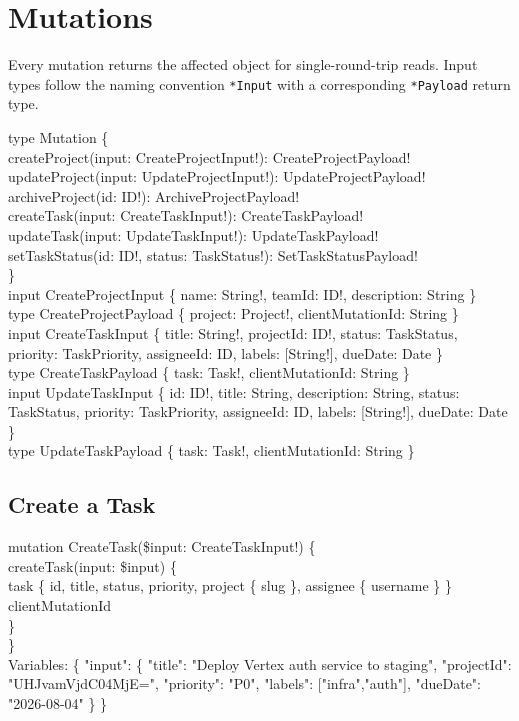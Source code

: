 \section*{Mutations}

Every mutation returns the affected object for single-round-trip reads. Input types follow the naming convention \texttt{*Input} with a corresponding \texttt{*Payload} return type.

\vspace{2pt}
\begin{schemabox}[title=Mutation Root \& Input Types (Partial)]
type Mutation \{\\
\quad createProject(input: CreateProjectInput!): CreateProjectPayload!\\
\quad updateProject(input: UpdateProjectInput!): UpdateProjectPayload!\\
\quad archiveProject(id: ID!): ArchiveProjectPayload!\\
\quad createTask(input: CreateTaskInput!): CreateTaskPayload!\\
\quad updateTask(input: UpdateTaskInput!): UpdateTaskPayload!\\
\quad setTaskStatus(id: ID!, status: TaskStatus!): SetTaskStatusPayload!\\
\}\\[2pt]
input CreateProjectInput \{ name: String!, teamId: ID!, description: String \}\\
type CreateProjectPayload \{ project: Project!, clientMutationId: String \}\\[2pt]
input CreateTaskInput \{ title: String!, projectId: ID!, status: TaskStatus, priority: TaskPriority, assigneeId: ID, labels: [String!], dueDate: Date \}\\
type CreateTaskPayload \{ task: Task!, clientMutationId: String \}\\[2pt]
input UpdateTaskInput \{ id: ID!, title: String, description: String, status: TaskStatus, priority: TaskPriority, assigneeId: ID, labels: [String!], dueDate: Date \}\\
type UpdateTaskPayload \{ task: Task!, clientMutationId: String \}
\end{schemabox}

\subsection*{Create a Task}

\vspace{2pt}
\begin{querybox}[title=Mutation: Create Task]
mutation CreateTask(\$input: CreateTaskInput!) \{\\
\quad createTask(input: \$input) \{\\
\qquad task \{ id, title, status, priority, project \{ slug \}, assignee \{ username \} \}\\
\qquad clientMutationId\\
\quad \}\\
\}\\[2pt]
Variables: \{ "input": \{ "title": "Deploy Vertex auth service to staging", "projectId": "UHJvamVjdC04MjE=", "priority": "P0", "labels": ["infra","auth"], "dueDate": "2026-08-04" \} \}
\end{querybox}

